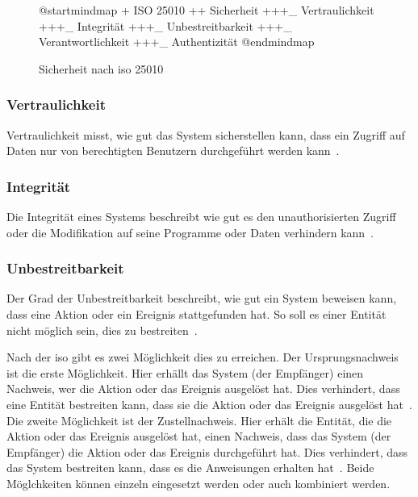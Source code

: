 \documentclass[12pt, a4paper, ngerman]{article}
\begin{document}
\begin{figure}
  \centering
  \begin{plantuml}
    @startmindmap
    + ISO 25010
    ++ Sicherheit
    +++_ Vertraulichkeit
    +++_ Integrität
    +++_ Unbestreitbarkeit
    +++_ Verantwortlichkeit
    +++_ Authentizität
    @endmindmap
  \end{plantuml}
  \caption{Sicherheit nach \ac{iso} 25010~\cite{ISO25010}}
  \label{fig:uml:security}
\end{figure}

\subsubsection{Vertraulichkeit}

Vertraulichkeit misst, wie gut das System sicherstellen kann, 
dass ein Zugriff auf Daten nur von berechtigten Benutzern durchgeführt werden kann~\cite{ISO25010}.

\subsubsection{Integrität}

Die Integrität eines Systems beschreibt wie gut es den unauthorisierten Zugriff 
oder die Modifikation auf seine Programme oder Daten verhindern kann~\cite{ISO25010}.

\subsubsection{Unbestreitbarkeit}

Der Grad der Unbestreitbarkeit beschreibt, wie gut ein System beweisen kann, 
dass eine Aktion oder ein Ereignis stattgefunden hat.
So soll es einer Entität nicht möglich sein, dies zu bestreiten~\cite{ISO25010}.

Nach der \ac{iso} gibt es zwei Möglichkeit dies zu erreichen.
Der Ursprungsnachweis ist die erste Möglichkeit. 
Hier erhällt das System (der Empfänger) einen Nachweis, wer die Aktion oder das Ereignis ausgelöst hat.
Dies verhindert, dass eine Entität bestreiten kann, dass sie die Aktion oder das Ereignis ausgelöst hat~\cite{ISO7498-2}.
Die zweite Möglichkeit ist der Zustellnachweis.
Hier erhält die Entität, die die Aktion oder das Ereignis ausgelöst hat, 
einen Nachweis, dass das System (der Empfänger) die Aktion oder das Ereignis durchgeführt hat.
Dies verhindert, dass das System bestreiten kann, dass es die Anweisungen erhalten hat~\cite{ISO7498-2}.
Beide Möglchkeiten können einzeln eingesetzt werden oder auch kombiniert werden.
\end{document}
